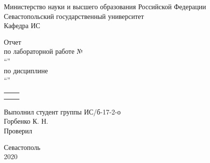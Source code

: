 \begin{titlepage}
    
    \thispagestyle{empty}
    
    \begin{center}
        
        Министерство науки и высшего образования Российской Федерации \\
        Севастопольский государственный университет \\
        Кафедра ИС
        
        \vfill

        Отчет \\
        по лабораторной работе №\mylabnumber \\
        \enquote{\mylabtitle} \\
        по дисциплине \\
        \enquote{\MakeTextUppercase{\mysubject}}

        \vspace{2cm}

        \begin{tabular}{ | c | c | }
            \hline
            \hspace{7cm} & \hspace{7cm} \\
            \hspace{7cm} & \hspace{7cm} \\
            \hline
        \end{tabular}

    \end{center}

    \vspace{1cm}

    \noindent\hspace{7.5cm} Выполнил студент группы ИС/б-17-2-о \\
    \null\hspace{7.5cm} Горбенко К. Н. \\
    \null\hspace{7.5cm} Проверил \\
    \null\hspace{7.5cm} \mylecturer

    \vfill

    \begin{center}
        Севастополь \\
        2020
    \end{center}

\end{titlepage}